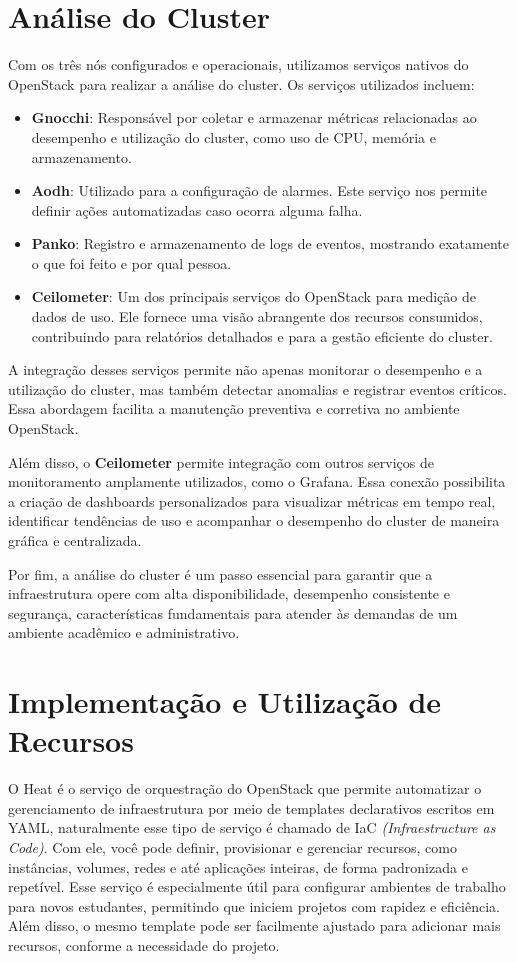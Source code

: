 \section{Análise do Cluster}

Com os três nós configurados e operacionais, utilizamos serviços nativos do OpenStack para realizar a análise do cluster. Os serviços utilizados incluem:

\begin{itemize}
    \item \textbf{Gnocchi}: Responsável por coletar e armazenar métricas relacionadas ao desempenho e utilização do cluster, como uso de CPU, memória e armazenamento.
    \item \textbf{Aodh}: Utilizado para a configuração de alarmes. Este serviço nos permite definir ações automatizadas caso ocorra alguma falha.
    \item \textbf{Panko}: Registro e armazenamento de logs de eventos, mostrando exatamente o que foi feito e por qual pessoa.
    \item \textbf{Ceilometer}: Um dos principais serviços do OpenStack para medição de dados de uso. Ele fornece uma visão abrangente dos recursos consumidos, contribuindo para relatórios detalhados e para a gestão eficiente do cluster.
\end{itemize}

A integração desses serviços permite não apenas monitorar o desempenho e a utilização do cluster, mas também detectar anomalias e registrar eventos críticos. Essa abordagem facilita a manutenção preventiva e corretiva no ambiente OpenStack.

Além disso, o \textbf{Ceilometer} permite integração com outros serviços de monitoramento amplamente utilizados, como o Grafana. Essa conexão possibilita a criação de dashboards personalizados para visualizar métricas em tempo real, identificar tendências de uso e acompanhar o desempenho do cluster de maneira gráfica e centralizada. 

Por fim, a análise do cluster é um passo essencial para garantir que a infraestrutura opere com alta disponibilidade, desempenho consistente e segurança, características fundamentais para atender às demandas de um ambiente acadêmico e administrativo.


\section{Implementação e Utilização de Recursos}
O Heat é o serviço de orquestração do OpenStack que permite automatizar o gerenciamento de infraestrutura por meio de templates declarativos escritos em YAML, naturalmente esse tipo de serviço é chamado de IaC  \textit{(Infraestructure as Code)}. Com ele, você pode definir, provisionar e gerenciar recursos, como instâncias, volumes, redes e até aplicações inteiras, de forma padronizada e repetível. Esse serviço é especialmente útil para configurar ambientes de trabalho para novos estudantes, permitindo que iniciem projetos com rapidez e eficiência. Além disso, o mesmo template pode ser facilmente ajustado para adicionar mais recursos, conforme a necessidade do projeto.

